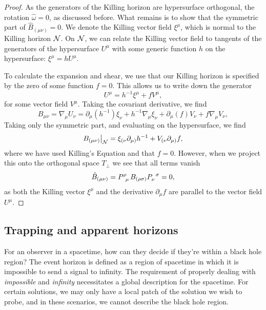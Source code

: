 \begin{proof}
	As the generators of the Killing horizon are hypersurface orthogonal, the rotation $\hat{\omega} = 0$, as discussed before. What remains is to show that the symmetric part of $\hat{B}_{(\mu \nu)} = 0$. We denote the Killing vector field  $\xi^\mu$, which is normal to the Killing horizon ${\cal N}$. On ${\cal N}$, we can relate the Killing vector field to tangents of the generators of the hypersurface $U^\mu$ with some generic function $h$ on the hypersurface: $\xi^\mu = h U^\mu$. 
		
	To calculate the expansion and shear, we use that our Killing horizon is specified by the zero of some function $f = 0$. This allows us to write down the generator 
	\begin{equation*}
		U^\mu = h^{-1} \xi^\mu + f V^\mu,
	\end{equation*}
	for some vector field $V^\mu$. Taking the covariant derivative, we find
	\begin{equation*}
		B_{\mu \nu} = \nabla_\mu U_\nu = \partial_\mu(h^{-1}) \xi_\nu + h^{-1} \nabla_\mu \xi_\nu + \partial_\mu(f) V_\nu + f \nabla_\mu V_\nu,
	\end{equation*}
	Taking only the symmetric part, and evaluating on the hypersurface, we find
	\begin{equation*}
		B_{(\mu \nu)} \big|_{{\cal N}} = \xi_{(\nu} \partial_{\mu)} h^{-1} +  V_{(\nu} \partial_{\mu)} f,
	\end{equation*}
	where we have used Killing's Equation  and that $f = 0$. However, when we project this onto the orthogonal space $T_\perp$ we see that all terms vanish
	\begin{equation*}
		\hat{B}_{(\mu \nu)} = \tensor{P}{^\rho_\mu} B_{(\rho \sigma)} \tensor{P}{_\nu^\sigma} = 0,
	\end{equation*}
	as both the Killing vector $\xi^\mu$ and the derivative $\partial_\mu f$ are parallel to the vector field $U^\mu$. 	
\end{proof}


\subsection{Trapping and apparent horizons}
\label{sec:trapping}
For an observer in a spacetime, how can they decide if they're within a black hole region? The event horizon is defined as a region of spacetime in which it is impossible to send a signal to infinity. The requirement of properly dealing with \emph{impossible} and \emph{infinity} necessitates a global description for the spacetime. For certain solutions, we may only have a local patch of the solution we wish to probe, and in these scenarios, we cannot describe the black hole region.

